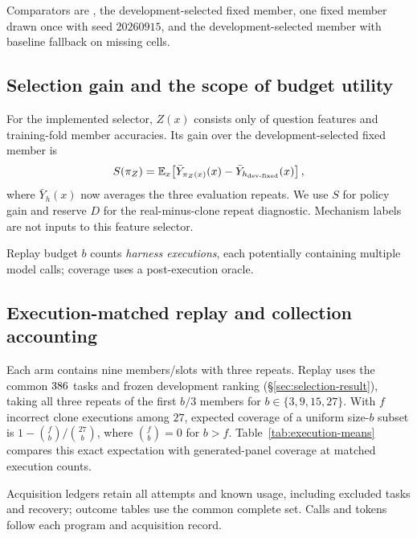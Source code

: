 Comparators are \bare{}, the development-selected fixed member,
one fixed member drawn once with seed $20260915$, and the
development-selected member with baseline fallback on missing cells.

\begin{table}[H]
\centering\small

\caption{\textbf{Frozen comparators on the common $\RcvPairedN$-task MATH
analysis set.} Every selected member has all three scores on every task.
Accuracy is repeat-mean correctness; paired differences are against
dev-fixed with $2{,}000$ task-bootstrap draws. The feature policy,
dev-fixed, and fallback policy all retain their recorded \bare{} choices.
The randomly drawn fixed member is \texttt{gsm\_kimi\_s0\_g3}.
Recorded policies are evaluated on fresh executions of these tasks.}
\label{tab:wp1r-policy}
\end{table}

\FloatBarrier
\subsection{Selection gain and the scope of budget utility}
For the implemented selector, $Z(x)$ consists only of question features
and training-fold member accuracies. Its gain over the
development-selected fixed member is
\[
 S(\pi_Z)=\mathbb E_x\!\left[
 \bar Y_{\pi_Z(x)}(x)-\bar Y_{h_{\rm dev\text{-}fixed}}(x)\right],
\]
where $\bar Y_h(x)$ now averages the three evaluation repeats. We use
$S$ for policy gain and reserve $D$ for the real-minus-clone repeat
diagnostic. Mechanism labels are not inputs to this feature selector.

Replay budget $b$ counts \emph{harness executions}, each potentially
containing multiple model calls; coverage uses a post-execution oracle.

\subsection{Execution-matched replay and collection accounting}
Each arm contains nine members/slots with three repeats. Replay uses the
common $\RcvPairedN$ tasks and frozen development ranking
(\S\ref{sec:selection-result}), taking all three repeats of the first
$b/3$ members for $b\in\{3,9,15,27\}$. With $f$ incorrect clone
executions among $27$, expected coverage of a uniform size-$b$ subset is
$1-\binom{f}{b}/\binom{27}{b}$, where $\binom{f}{b}=0$ for $b>f$.
Table~\ref{tab:execution-means} compares this exact expectation with
generated-panel coverage at matched execution counts.

Acquisition ledgers retain all attempts and known usage, including
excluded tasks and recovery; outcome tables use the common complete set.
Calls and tokens follow each program and acquisition record.
